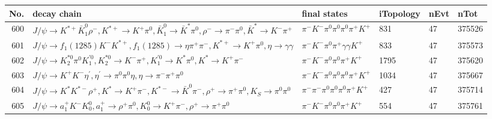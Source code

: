 \begin{table}[htbp] 
\begin{center}
\begin{small}
\begin{tabular}{rlllll}\hline\hline
 No. & decay chain & final states &  iTopology & nEvt & nTot \\\hline
600&$J/\psi       \rightarrow K^{*+}         \bar{K}_1^{0} \rho^{-}      , K^{*+}          \rightarrow K^{+}          \pi^{0}        , \bar{K}_1^{0}  \rightarrow \bar{K}^{*}   \pi^{0}        , \rho^{-}       \rightarrow \pi^{-}        \pi^{0}        , \bar{K}^{*}    \rightarrow K^{-}          \pi^{+}        $&$\pi^{-}        K^{-}          \pi^{0}        \pi^{0}        \pi^{0}        \pi^{+}        K^{+}          $&  831&   47&375526\\
601&$J/\psi       \rightarrow f_{1}(1285)    K^{-}          K^{*+}         , f_{1}(1285)     \rightarrow \eta          \pi^{+}        \pi^{-}        , K^{*+}          \rightarrow K^{+}          \pi^{0}        , \eta           \rightarrow \gamma       \gamma       $&$\pi^{-}        K^{-}          \pi^{0}        \pi^{+}        \gamma       \gamma       K^{+}          $&  833&   47&375573\\
602&$J/\psi       \rightarrow K_2^{*0}       \pi^{0}        K_1^{'0}      , K_2^{*0}        \rightarrow K^{-}          \pi^{+}        , K_1^{'0}       \rightarrow K^{*}          \pi^{0}        , K^{*}           \rightarrow K^{+}          \pi^{-}        $&$\pi^{-}        K^{-}          \pi^{0}        \pi^{0}        \pi^{+}        K^{+}          $& 1795&   47&375620\\
603&$J/\psi       \rightarrow K^{+}          K^{-}          \eta^{\prime} , \eta^{\prime}  \rightarrow \pi^{0}        \pi^{0}        \eta          , \eta           \rightarrow \pi^{-}        \pi^{+}        \pi^{0}        $&$\pi^{-}        K^{-}          \pi^{0}        \pi^{0}        \pi^{0}        \pi^{+}        K^{+}          $& 1034&   47&375667\\
604&$J/\psi       \rightarrow K^{*}          K^{*-}         \rho^{+}      , K^{*}           \rightarrow K^{+}          \pi^{-}        , K^{*-}          \rightarrow \bar{K}^{0}   \pi^{-}        , \rho^{+}       \rightarrow \pi^{+}        \pi^{0}        , K_{S}           \rightarrow \pi^{0}        \pi^{0}        $&$\pi^{-}        \pi^{-}        \pi^{0}        \pi^{0}        \pi^{0}        \pi^{+}        K^{+}          $&  427&   47&375714\\
605&$J/\psi       \rightarrow a_{1}^{+}      K^{-}          K_0^{0}        , a_{1}^{+}       \rightarrow \rho^{+}      \pi^{0}        , K_0^{0}         \rightarrow K^{+}          \pi^{-}        , \rho^{+}       \rightarrow \pi^{+}        \pi^{0}        $&$\pi^{-}        K^{-}          \pi^{0}        \pi^{0}        \pi^{+}        K^{+}          $&  554&   47&375761\\

\end{tabular}
\end{small}
\end{center}
\end{table}
